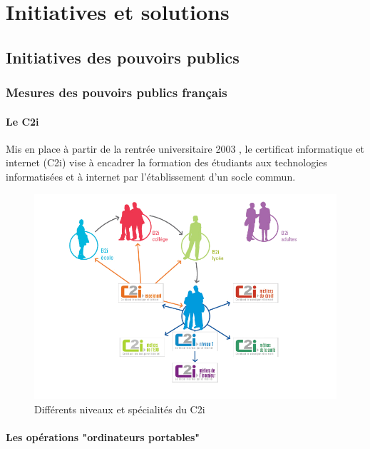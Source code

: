 
\part{Initiatives et solutions}\label{initiatives_actuelles}

\chapter{Initiatives des pouvoirs publics}
\label{sec:initialivespublic}

\section{Mesures des pouvoirs publics français}

\subsection{Le C2i}
Mis en place à partir de la rentrée universitaire 2003 \cite{circulaire_c2i}, le certificat informatique et internet (C2i) vise à encadrer la formation des étudiants aux technologies informatisées et à internet par l'établissement d'un socle commun.

\begin{figure}[H]
  \centering
  \includegraphics[width=\textwidth]{../resources/illustrations/c2i}
  \caption{Différents niveaux et spécialités du C2i}
\end{figure}

\cite{b2i_c2i}
\cite{b2i}
\cite{isn}

\subsection{Les opérations "ordinateurs portables"}

